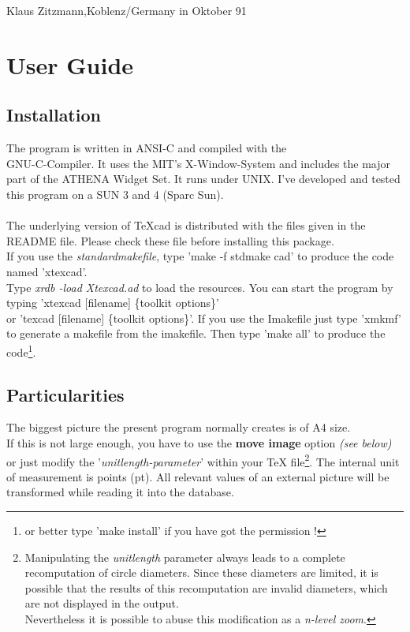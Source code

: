   \hfill    Klaus Zitzmann,\hfill Koblenz/Germany in Oktober 91 \\
  
\newpage
  
\section{User Guide}

\subsection{Installation}

The program is written in ANSI-C and compiled with the\\
GNU-C-Compiler.
It uses the MIT's X-Window-System and includes the major
part of the ATHENA Widget Set. It runs under UNIX.
I've developed and tested this program on a SUN 3 and 4 (Sparc Sun).\\
\\
The underlying version of TeXcad is distributed with the files given in the README file. Please check these file before installing this package.\\


If you use the {\it standardmakefile}, type 'make -f stdmake cad' to produce the
code named 'xtexcad'.\\
Type {\it xrdb -load Xtexcad.ad} to load the resources.
You can start the program by typing 'xtexcad [filename] \{toolkit options\}'\\
or 'texcad [filename] \{toolkit options\}'.
If you use the Imakefile just type 'xmkmf' to
generate a makefile from the imakefile. Then type 'make all' to produce the code\footnote{or better type 'make install' if you have got the permission !}.

\subsection{Particularities}

The biggest picture the present program normally creates is of A4 size.\\
If this is not large enough, you have to use the {\bf move image} option {\it (see below)}
or just modify the '{\it unitlength-parameter}' within your TeX file\footnote{Manipulating 
the {\it unitlength} parameter always leads to a complete recomputation
of circle diameters. Since these diameters are limited, it is possible that the results of this
recomputation are invalid diameters, which are not displayed in the output.\\
Nevertheless it is possible to abuse this modification as a {\it n-level zoom}.}.
The internal unit of measurement is points (pt). All relevant
values of an external picture will be transformed while reading
it into the database.


